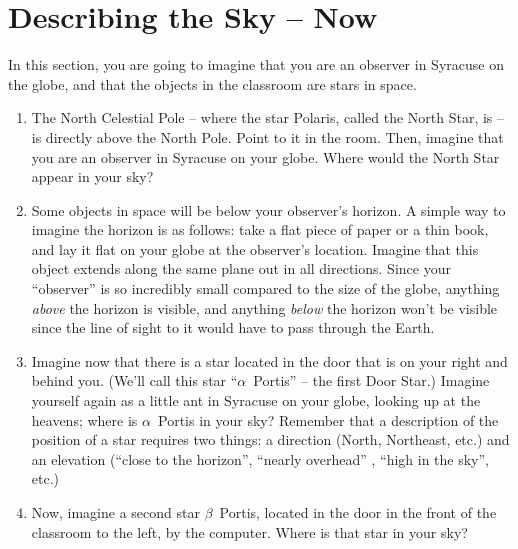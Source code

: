 \documentclass[12pt]{article}
\begin{document}
\section{Describing the Sky -- Now}

In this section, you are going to imagine that you are an observer in Syracuse on the globe, 
and that the objects in the classroom are stars in space. 

\begin{enumerate}
\item The North Celestial Pole -- where the star Polaris, called the North Star, is -- is directly above the North Pole.
Point to it in the room. Then, imagine that you are an observer in Syracuse on your globe. Where would the North Star appear
in your sky?

\vspace{1in}

\item Some objects in space will be below your observer's horizon. A simple way to imagine the horizon is as follows: take a 
flat piece of paper or a thin book, and lay it flat on your globe at the observer's location. Imagine that this
object extends along the same plane out in all directions. Since your ``observer'' is so incredibly small
compared to the size of the globe, anything {\it above} the horizon is visible, and anything {\it below} the horizon 
won't be visible since the line of sight to it would have to pass through the Earth. 

\item Imagine now that there is a star located in the door that is on your right and behind you. (We'll call this star
``$\alpha$~Portis'' -- the first Door Star.) Imagine yourself again as a little ant in Syracuse on your globe, looking up
at the heavens; where is $\alpha$~Portis in your sky? Remember that a description of the position of a star requires two
things: a direction (North, Northeast, etc.) and an elevation (``close to the horizon'', ``nearly overhead'' , ``high in the sky'',
etc.) 

\vspace{1in}

\item Now, imagine a second star $\beta$~Portis, located in the door in the front of the classroom to the left, by the computer. 
Where is that star in your sky?

\vspace{1in}

\end{enumerate}
\end{document}
